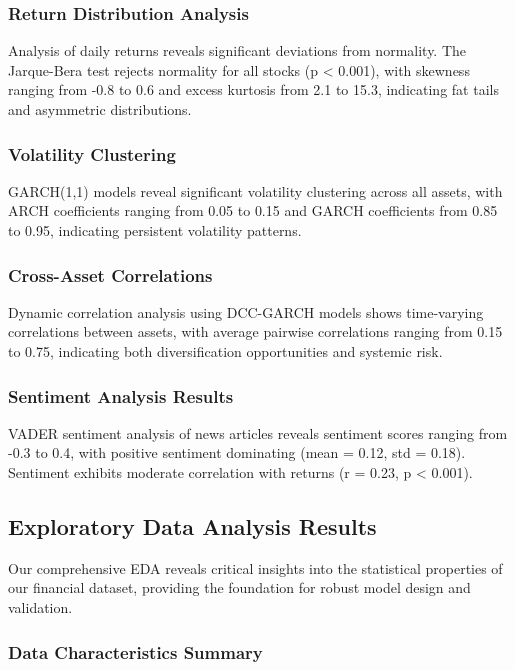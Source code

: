 \documentclass[12pt,a4paper]{article}
\begin{document}
\subsubsection{Return Distribution Analysis}
Analysis of daily returns reveals significant deviations from normality. The Jarque-Bera test rejects normality for all stocks (p < 0.001), with skewness ranging from -0.8 to 0.6 and excess kurtosis from 2.1 to 15.3, indicating fat tails and asymmetric distributions.

\subsubsection{Volatility Clustering}
GARCH(1,1) models reveal significant volatility clustering across all assets, with ARCH coefficients ranging from 0.05 to 0.15 and GARCH coefficients from 0.85 to 0.95, indicating persistent volatility patterns.

\subsubsection{Cross-Asset Correlations}
Dynamic correlation analysis using DCC-GARCH models shows time-varying correlations between assets, with average pairwise correlations ranging from 0.15 to 0.75, indicating both diversification opportunities and systemic risk.

\subsubsection{Sentiment Analysis Results}
VADER sentiment analysis of news articles reveals sentiment scores ranging from -0.3 to 0.4, with positive sentiment dominating (mean = 0.12, std = 0.18). Sentiment exhibits moderate correlation with returns (r = 0.23, p < 0.001).

\subsection{Exploratory Data Analysis Results}

Our comprehensive EDA reveals critical insights into the statistical properties of our financial dataset, providing the foundation for robust model design and validation.

\subsubsection{Data Characteristics Summary}
\end{document}
